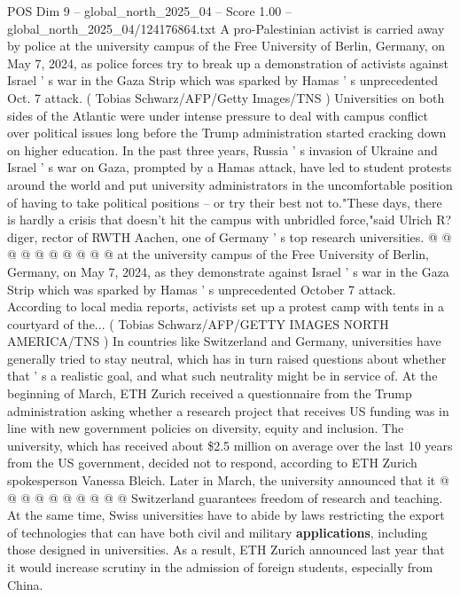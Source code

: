 \begin{textsample}{POS Dim 9 – global\_north\_2025\_04 – Score 1.00 – global\_north\_2025\_04/124176864.txt}  \label{ex:f9_pos_320}
A pro-Palestinian activist is carried away by police at the university campus of the Free University of Berlin, Germany, on May 7, 2024, as police forces try to break up a demonstration of activists against Israel ' s war in the Gaza Strip which was sparked by Hamas ' s unprecedented Oct. 7 attack. ( Tobias Schwarz/AFP/Getty Images/TNS ) Universities on both sides of the Atlantic were under intense pressure to deal with campus conflict over political issues long before the Trump administration started cracking down on higher education.
In the past three years, Russia ' s invasion of Ukraine and Israel ' s war on Gaza, prompted by a Hamas attack, have led to student protests around the world and put university administrators in the uncomfortable position of having to take political positions -- or try their best not to."These days, there is hardly a crisis that doesn't hit the campus with unbridled force,"said Ulrich R? diger, rector of RWTH Aachen, one of Germany ' s top research universities. @ @ @ @ @ @ @ @ @ @ at the university campus of the Free University of Berlin, Germany, on May 7, 2024, as they demonstrate against Israel ' s war in the Gaza Strip which was sparked by Hamas ' s unprecedented October 7 attack.
According to local media reports, activists set up a protest camp with tents in a courtyard of the... ( Tobias Schwarz/AFP/GETTY IMAGES NORTH AMERICA/TNS ) In countries like Switzerland and Germany, universities have generally tried to stay neutral, which has in turn raised questions about whether that ' s a realistic goal, and what such neutrality might be in service of.
At the beginning of March, ETH Zurich received a questionnaire from the Trump administration asking whether a research project that receives US funding was in line with new government policies on diversity, equity and inclusion.
The university, which has received about \$2.5 million on average over the last 10 years from the US government, decided not to respond, according to ETH Zurich spokesperson Vanessa Bleich.
Later in March, the university announced that it @ @ @ @ @ @ @ @ @ @ Switzerland guarantees freedom of research and teaching.
At the same time, Swiss universities have to abide by laws restricting the export of technologies that can have both civil and military \textbf{applications}, including those designed in universities.
As a result, ETH Zurich announced last year that it would increase scrutiny in the admission of foreign students, especially from China.

\end{textsample}
